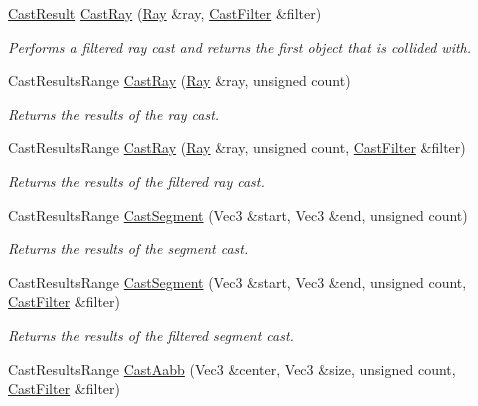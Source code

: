 \begin{DoxyCompactItemize}
\hyperlink{structDCEngine_1_1CastResult}{Cast\-Result} \hyperlink{classDCEngine_1_1Systems_1_1Physics_a0d08cbe2430fe1b685897f64292e51b8}{Cast\-Ray} (\hyperlink{structDCEngine_1_1Ray}{Ray} \&ray, \hyperlink{structDCEngine_1_1CastFilter}{Cast\-Filter} \&filter)
\begin{DoxyCompactList}\small\item\em Performs a filtered ray cast and returns the first object that is collided with. \end{DoxyCompactList}\item 
Cast\-Results\-Range \hyperlink{classDCEngine_1_1Systems_1_1Physics_a0fdbbf6cd3836a5684bbee34e03cac45}{Cast\-Ray} (\hyperlink{structDCEngine_1_1Ray}{Ray} \&ray, unsigned count)
\begin{DoxyCompactList}\small\item\em Returns the results of the ray cast. \end{DoxyCompactList}\item 
Cast\-Results\-Range \hyperlink{classDCEngine_1_1Systems_1_1Physics_a71c3da317accdb31821da671b4a9c8ce}{Cast\-Ray} (\hyperlink{structDCEngine_1_1Ray}{Ray} \&ray, unsigned count, \hyperlink{structDCEngine_1_1CastFilter}{Cast\-Filter} \&filter)
\begin{DoxyCompactList}\small\item\em Returns the results of the filtered ray cast. \end{DoxyCompactList}\item 
Cast\-Results\-Range \hyperlink{classDCEngine_1_1Systems_1_1Physics_ae016fa032c636564fa3790361005cd05}{Cast\-Segment} (Vec3 \&start, Vec3 \&end, unsigned count)
\begin{DoxyCompactList}\small\item\em Returns the results of the segment cast. \end{DoxyCompactList}\item 
Cast\-Results\-Range \hyperlink{classDCEngine_1_1Systems_1_1Physics_a7ec37a2458485c7fbdf727db7b075e94}{Cast\-Segment} (Vec3 \&start, Vec3 \&end, unsigned count, \hyperlink{structDCEngine_1_1CastFilter}{Cast\-Filter} \&filter)
\begin{DoxyCompactList}\small\item\em Returns the results of the filtered segment cast. \end{DoxyCompactList}\item 
Cast\-Results\-Range \hyperlink{classDCEngine_1_1Systems_1_1Physics_afb1520219f87fc75feb74f24031a5e26}{Cast\-Aabb} (Vec3 \&center, Vec3 \&size, unsigned count, \hyperlink{structDCEngine_1_1CastFilter}{Cast\-Filter} \&filter)

\end{DoxyCompactItemize}
